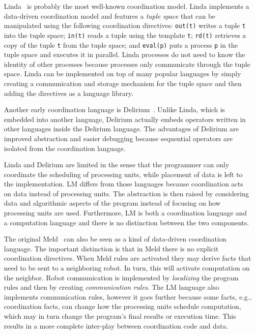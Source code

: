 Linda~\cite{linda} is probably the most well-known coordination model. Linda
implements a data-driven coordination model and features a \emph{tuple space}
that can be manipulated using the following coordination directives:
\texttt{out(t)} writes a tuple \texttt{t} into the tuple space; \texttt{in(t)}
reads a tuple using the template \texttt{t}; \texttt{rd(t)} retrieves a copy of
the tuple \texttt{t} from the tuple space; and \texttt{eval(p)} puts a process
\texttt{p} in the tuple space and executes it in parallel.  Linda processes do
not need to know the identity of other processes because processes only
communicate through the tuple space.  Linda can be implemented on top of many
popular languages by simply creating a communication and storage mechanism for
the tuple space and then adding the directives as a language library.

Another early coordination language is Delirium~\cite{Delirium}. Unlike Linda,
which is embedded into another language, Delirium actually embeds operators
written in other languages inside the Delirium language. The advantages of
Delirium are improved abstraction and easier debugging because sequential
operators are isolated from the coordination language.

Linda and Delirium are limited in the sense that the programmer can only
coordinate the scheduling of processing units, while placement of data is left
to the implementation. LM differs from those languages because coordination acts
on data instead of processing units. The abstraction is then raised by
considering data and algorithmic aspects of the program instead of focusing on
how processing units are used. Furthermore, LM is both a coordination language
and a computation language and there is no distinction between the two
components.

The original Meld~\cite{ashley-rollman-iclp09} can also be seen as a kind of
data-driven coordination language. The important distinction is that in Meld
there is no explicit coordination directives. When Meld rules are activated they
may derive facts that need to be sent to a neighboring robot. In turn, this will
activate computation on the neighbor. Robot communication is implemented by
\emph{localizing} the program rules and then by creating \emph{communication
rules}. The LM language also implements communication rules, however it goes
further because some facts, e.g., coordination facts, can change how the
processing units schedule computation, which may in turn change the program's
final results or execution time. This results in a more complete inter-play
between coordination code and data.

